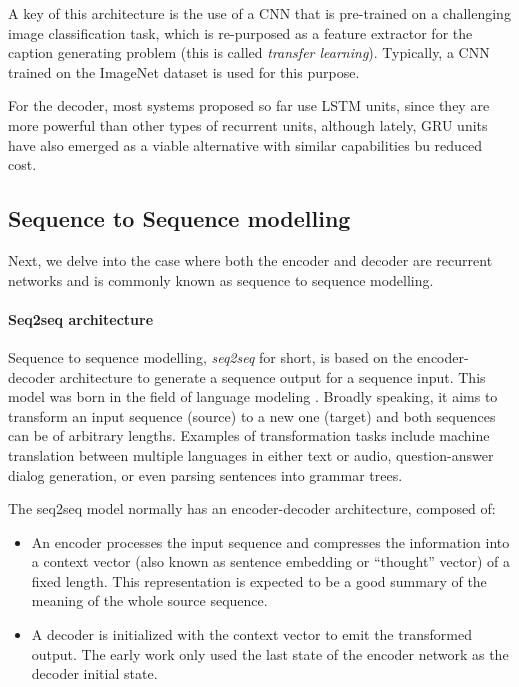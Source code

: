 A key of this architecture is the use of a CNN that is pre-trained on a challenging image classification task, which is re-purposed as a feature extractor for the caption generating problem (this is called \textit{transfer learning}). Typically, a CNN trained on the ImageNet dataset is used for this purpose.

For the decoder, most systems proposed so far use LSTM units, since they are more powerful than other types of recurrent units, although lately, GRU units have also emerged as a viable alternative with similar capabilities bu reduced cost.

\subsection{Sequence to Sequence  modelling}\label{subsec:seq2seq}

Next, we delve into the case where both the encoder and decoder are recurrent networks and is commonly known as sequence to sequence modelling.

\paragraph{Seq2seq architecture}
Sequence to sequence modelling, \textit{seq2seq} for short, is based on the encoder-decoder architecture to generate a sequence output for a sequence input. This model was born in the field of language modeling \citep{Sutskever2014}. Broadly speaking, it aims to transform an input sequence (source) to a new one (target) and both sequences can be of arbitrary lengths. Examples of transformation tasks include machine translation between multiple languages in either text or audio, question-answer dialog generation, or even parsing sentences into grammar trees.

The seq2seq model normally has an encoder-decoder architecture, composed of:
\begin{itemize}
    \item An encoder processes the input sequence and compresses the information into a context vector (also known as sentence embedding or “thought” vector) of a fixed length. This representation is expected to be a good summary of the meaning of the whole source sequence.
    \item A decoder is initialized with the context vector to emit the transformed output. The early work only used the last state of the encoder network as the decoder initial state.
\end{itemize}    

